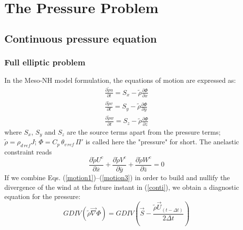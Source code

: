 
\chapter{The Pressure Problem}
\label{PressureProblem}
\minitoc


\section{Continuous pressure equation}
\subsection{Full elliptic problem}
\par In the Meso-NH model formulation, the equations of motion are
expressed as:
\begin{eqnarray}
\label{motion1}
\frac {\partial{\tilde{\rho} { u }} } {\partial{t} } = S_x - \tilde{\rho}
\frac{\partial{\Phi} }{\partial{x} } \\
\label{motion2}
\frac {\partial{\tilde{\rho} { v }} } {\partial{t} } = S_y - \tilde{\rho}
\frac{\partial{\Phi} }{\partial y} \\
\label{motion3}
\frac {\partial{\tilde{\rho} {w}} } {\partial{t} } = S_z - \tilde{\rho}
\frac{\partial{\Phi} }{\partial z}
\end{eqnarray}
where $S_x$, $S_y$ and $S_z$ are the source terms apart from the
pressure terms; $\tilde{\rho} = \rho_{d\,ref} J$; $\Phi = C_p \,
\theta_{v\,ref}\,\Pi '$ is called here the "pressure" for short.
The anelastic constraint reads\\
\begin{equation}
\label{conti}
     \dfrac {\partial{\tilde{\rho} U^{c} } } {\partial{\overline{x} } }
   + \dfrac {\partial{\tilde{\rho} V^{c} } } {\partial{\overline{y} } }
   + \dfrac {\partial{\tilde{\rho} W^{c} } } {\partial{\overline{z} } } = 0
\end{equation}
If we combine Eqs. (\ref{motion1})--(\ref{motion3}) in order to build and
nullify the divergence of the wind at the future instant in (\ref{conti}), we
obtain a diagnostic equation for the pressure:
\begin{equation}
\label{conteq}
GDIV(\tilde{\rho}  \overrightarrow{\nabla} \Phi) = GDIV \left(
\overrightarrow {S} -
\dfrac{\tilde{\rho} \vec{U}_{(t-\Delta t)} }
{2 \Delta t}
\right)
\end{equation}
